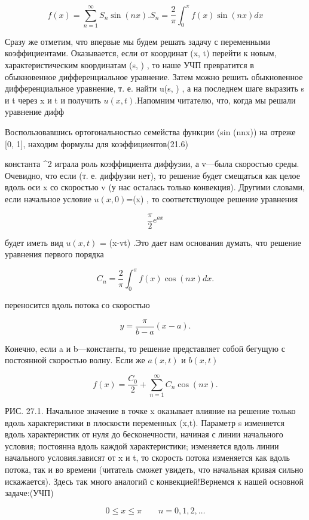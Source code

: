 \documentclass[
  ukrainian,
]{article}
\begin{document}
\[
f(x) = \sum_{n=1}^{\infty} S_n \sin(nx).
S_n = \frac{2}{\pi} \int_{0}^{\pi} f(x) \sin(nx) dx
\]

Сразу же отметим, что впервые мы будем решать задачу с переменными
коэффициентами. Оказывается, если от координат (x, t) перейти к новым,
характеристическим координатам (s, \tau) , то наше УЧП превратится в
обыкновенное дифференциальное уравнение. Затем можно решить обыкновенное
дифференциальное уравнение, т. е. найти u(s, \tau) , а на последнем шаге
выразить s и t через x и t и получить \(u(x, t)\).Напомним читателю,
что, когда мы решали уравнение дифф

Воспользовавшись ортогональностью семейства функции (sin (nnx)) на
отреже {[}0, 1{]}, находим формулы для коэффициентов(21.6)

константа \alpha\^{}2 играла роль коэффициента диффузии, а v---была
скоростью среды. Очевидно, что если  (т. е. диффузии нет), то
решение будет смещаться как целое вдоль оси x со скоростью v (у нас
осталась только конвекция). Другими словами, если начальное условие
\(u(x,0)\)=\varphi(x) , то соответствующее решение уравнения

\[
\frac{\pi}{2} e^{ax}
\]

будет иметь вид \(u(x, t)\) = \varphi(x-vt) .Это дает нам основания
думать, что решение уравнения первого порядка

\[
C_n = \frac{2}{\pi} \int_0^{\pi} f(x) \cos(nx) dx.
\]

переносится вдоль потока со скоростью

\[
y = \frac{\pi}{b-a}(x-a).
\]

Конечно, если a и b---константы, то решение представляет собой бегущую с
постоянной скоростью волну. Если же \(a(x, t)\) и \(b(x, t)\)

\[
f(x) = \frac{C_0}{2} + \sum_{n=1}^{\infty} C_n \cos(nx).
\]

РИС. 27.1. Начальное значение в точке x оказывает влияние на решение
только вдоль характеристики в плоскости переменных (x,t). Параметр s
изменяется вдоль характеристик от нуля до бесконечности, начиная с линии
начального условия; \tau   постоянна вдоль каждой характеристики;
\tau   изменяется вдоль линии начального условия.зависят от x и t, то
скорость потока изменяется как вдоль потока, так и во времени (читатель
сможет увидеть, что начальная кривая сильно искажается). Здесь так много
аналогий с конвекцией!Вернемся к нашей основной задаче:(УЧП)

\[
0 \le x \le \pi \qquad n = 0, 1, 2, \dots
\]
\end{document}
